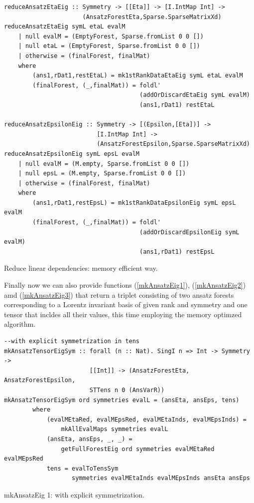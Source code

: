 \documentclass[a4paper,12pt, DIV=14, BCOR=5mm, twoside, headsepline, numbers=noenddot]{scrbook}
\begin{document}
\begin{listing}[hbt!]
\begin{verbatim}
reduceAnsatzEtaEig :: Symmetry -> [[Eta]] -> [I.IntMap Int] ->
                      (AnsatzForestEta,Sparse.SparseMatrixXd)
reduceAnsatzEtaEig symL etaL evalM
    | null evalM = (EmptyForest, Sparse.fromList 0 0 [])
    | null etaL = (EmptyForest, Sparse.fromList 0 0 [])
    | otherwise = (finalForest, finalMat)
    where
        (ans1,rDat1,restEtaL) = mk1stRankDataEtaEig symL etaL evalM
        (finalForest, (_,finalMat)) = foldl' 
                                      (addOrDiscardEtaEig symL evalM)
                                      (ans1,rDat1) restEtaL

reduceAnsatzEpsilonEig :: Symmetry -> [(Epsilon,[Eta])] ->
                          [I.IntMap Int] ->
                          (AnsatzForestEpsilon,Sparse.SparseMatrixXd)
reduceAnsatzEpsilonEig symL epsL evalM
    | null evalM = (M.empty, Sparse.fromList 0 0 [])
    | null epsL = (M.empty, Sparse.fromList 0 0 [])
    | otherwise = (finalForest, finalMat)
    where
        (ans1,rDat1,restEpsL) = mk1stRankDataEpsilonEig symL epsL evalM
        (finalForest, (_,finalMat)) = foldl'
                                      (addOrDiscardEpsilonEig symL evalM)
                                      (ans1,rDat1) restEpsL
\end{verbatim} 
\caption{Reduce linear dependencies: memory efficient way.}\label{redMem}
\end{listing}

Finally now we can also provide functions (\ref{mkAnsatzEig1}), (\ref{mkAnsatzEig2}) amd (\ref{mkAnsatzEig3}) that return a triplet consisting of two ansatz forests corresponding to a Lorentz invariant basis of given rank and symmetry and one tensor that incldes all their values, this time employing the memory optimzed algorithm. 

\begin{listing}[hbt!]
\begin{verbatim}
--with explicit symmetrization in tens
mkAnsatzTensorEigSym :: forall (n :: Nat). SingI n => Int -> Symmetry ->
                        [[Int]] -> (AnsatzForestEta, AnsatzForestEpsilon,
                        STTens n 0 (AnsVarR))
mkAnsatzTensorEigSym ord symmetries evalL = (ansEta, ansEps, tens)
        where
            (evalMEtaRed, evalMEpsRed, evalMEtaInds, evalMEpsInds) =
                mkAllEvalMaps symmetries evalL 
            (ansEta, ansEps, _, _) =
                getFullForestEig ord symmetries evalMEtaRed evalMEpsRed
            tens = evalToTensSym
                   symmetries evalMEtaInds evalMEpsInds ansEta ansEps
\end{verbatim} 
\caption{mkAnsatzEig 1: with explicit symmetrization.}\label{mkAnsatzEig1}
\end{listing}
\end{document}
